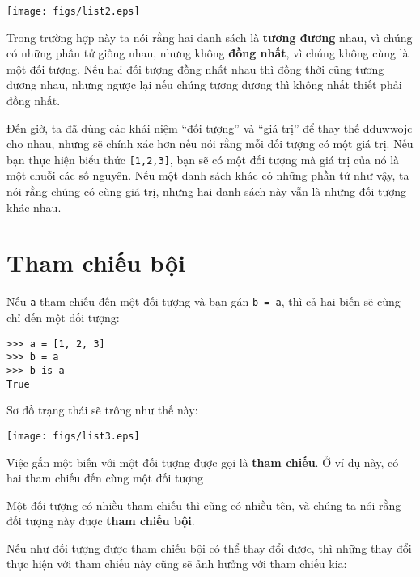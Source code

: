 \documentclass[11pt]{book}
\begin{document}

\beforefig
\centerline{\texttt{[image: figs/list2.eps]}}
\afterfig

Trong trường hợp này ta nói rằng hai danh sách là {\bf tương đương} nhau,
vì chúng có những phần tử giống nhau, nhưng không {\bf đồng nhất}, vì
chúng không cùng là một đối tượng. Nếu hai đối tượng đồng nhất nhau thì
đồng thời cũng tương đương nhau, nhưng ngược lại nếu chúng tương đương thì
không nhất thiết phải đồng nhất.


Đến giờ, ta đã dùng các khái niệm ``đối tượng'' và ``giá trị'' để thay thế
dduwwojc cho nhau, nhưng sẽ chính xác hơn nếu nói rằng mỗi đối tượng có
một giá trị. Nếu bạn thực hiện biểu thức {\tt [1,2,3]}, bạn sẽ có một đối
tượng mà giá trị của nó là một chuỗi các số nguyên. Nếu một danh sách khác
có những phần tử như vậy, ta nói rằng chúng có cùng giá trị, nhưng hai
danh sách này vẫn là những đối tượng khác nhau.



\section{Tham chiếu bội}


Nếu {\tt a} tham chiếu đến một đối tượng và bạn gán {\tt b = a},
thì cả hai biến sẽ cùng chỉ đến một đối tượng:

\beforeverb
\begin{verbatim}
>>> a = [1, 2, 3]
>>> b = a
>>> b is a
True
\end{verbatim}
\afterverb
%
Sơ đồ trạng thái sẽ trông như thế này:


\beforefig
\centerline{\texttt{[image: figs/list3.eps]}}
\afterfig

Việc gắn một biến với một đối tượng được gọi là  {\bf
tham chiếu}. Ở ví dụ này, có hai tham chiếu đến cùng
một đối tượng


Một đối tượng có nhiều tham chiếu thì cũng có nhiều tên,
và chúng ta nói rằng đối tượng này được {\bf tham chiếu bội}.


Nếu như đối tượng được tham chiếu bội có thể thay đổi được,
thì những thay đổi thực hiện với tham chiếu này cũng sẽ ảnh
hưởng với tham chiếu kia:
\end{document}
